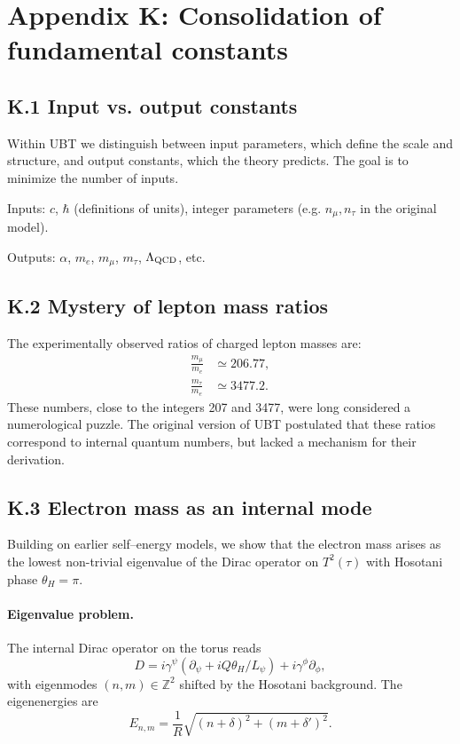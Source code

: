
\appendix
\section*{Appendix K: Consolidation of fundamental constants}

\subsection*{K.1 Input vs. output constants}
Within UBT we distinguish between input parameters, which define the scale and structure, 
and output constants, which the theory predicts. The goal is to minimize the number of inputs.

Inputs: $c$, $\hbar$ (definitions of units), integer parameters (e.g. $n_\mu, n_\tau$ in the original model).

Outputs: $\alpha$, $m_e$, $m_\mu$, $m_\tau$, $\Lambda_{\rm QCD}$, etc.

\subsection*{K.2 Mystery of lepton mass ratios}
The experimentally observed ratios of charged lepton masses are:
\begin{align*}
\frac{m_\mu}{m_e} &\simeq 206.77, \\
\frac{m_\tau}{m_e} &\simeq 3477.2 .
\end{align*}
These numbers, close to the integers 207 and 3477, were long considered a numerological puzzle. 
The original version of UBT postulated that these ratios correspond to internal quantum numbers, 
but lacked a mechanism for their derivation.

\subsection*{K.3 Electron mass as an internal mode}
Building on earlier self–energy models, we show that the electron 
mass arises as the lowest non-trivial eigenvalue of the Dirac operator on 
$T^2(\tau)$ with Hosotani phase $\theta_H=\pi$. 

\paragraph{Eigenvalue problem.}
The internal Dirac operator on the torus reads
\begin{equation}
D = i\gamma^\psi \left(\partial_\psi + i Q \theta_H/L_\psi\right) 
  + i\gamma^\phi \partial_\phi ,
\end{equation}
with eigenmodes $(n,m)\in\mathbb{Z}^2$ shifted by the Hosotani background. 
The eigenenergies are
\begin{equation}
E_{n,m} = \frac{1}{R}\sqrt{(n+\delta)^2 + (m+\delta')^2}.
\end{equation}

